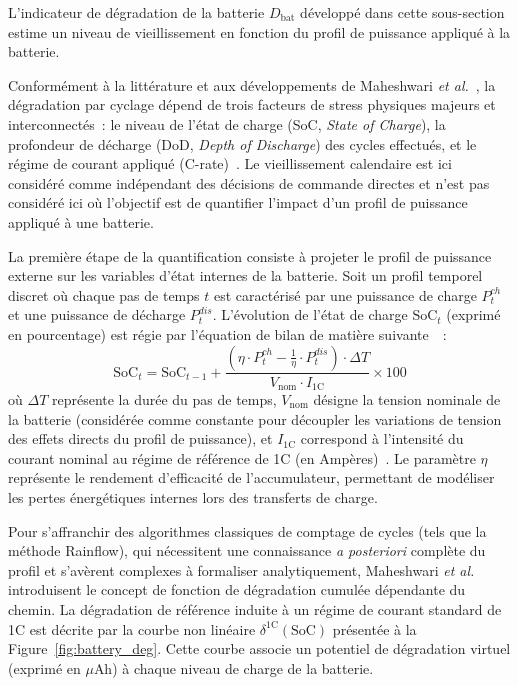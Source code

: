 L'indicateur de dégradation de la batterie $D_{\text{bat}}$ développé dans cette sous-section estime un niveau de vieillissement en fonction du profil de puissance appliqué à la batterie.  

Conformément à la littérature et aux développements de Maheshwari \textit{et al.}~\cite{maheshwari_optimizing_2020}, la dégradation par cyclage dépend de trois facteurs de stress physiques majeurs et interconnectés~: le niveau de l'état de charge (SoC, \textit{State of Charge}), la profondeur de décharge (DoD, \textit{Depth of Discharge}) des cycles effectués, et le régime de courant appliqué (C-rate)~\cite{madani_comprehensive_2025}\cite{asiri_impact_2025}. Le vieillissement calendaire est ici considéré comme indépendant des décisions de commande directes et n'est pas considéré ici où l'objectif est de quantifier l'impact d'un profil de puissance appliqué à une batterie. 

La première étape de la quantification consiste à projeter le profil de puissance externe sur les variables d'état internes de la batterie. Soit un profil temporel discret où chaque pas de temps $t$ est caractérisé par une puissance de charge $P_t^{ch}$ et une puissance de décharge $P_t^{dis}$. L'évolution de l'état de charge $\text{SoC}_t$ (exprimé en pourcentage) est régie par l'équation de bilan de matière suivante~\cite{maheshwari_optimizing_2020}~:
\begin{equation}
    \text{SoC}_t = \text{SoC}_{t-1} + \frac{(\eta \cdot P_t^{ch} - \frac{1}{\eta} \cdot P_t^{dis}) \cdot \Delta T}{V_{\text{nom}} \cdot I_{1\text{C}}} \times 100
    \label{eq:soc_evolution}
\end{equation}
où $\Delta T$ représente la durée du pas de temps, $V_{\text{nom}}$ désigne la tension nominale de la batterie (considérée comme constante pour découpler les variations de tension des effets directs du profil de puissance), et $I_{1\text{C}}$ correspond à l'intensité du courant nominal au régime de référence de 1C (en Ampères)~\cite{maheshwari_optimizing_2020}. Le paramètre $\eta$ représente le rendement d'efficacité de l'accumulateur, permettant de modéliser les pertes énergétiques internes lors des transferts de charge.

Pour s'affranchir des algorithmes classiques de comptage de cycles (tels que la méthode Rainflow), qui nécessitent une connaissance \textit{a posteriori} complète du profil et s'avèrent complexes à formaliser analytiquement, Maheshwari \textit{et al.}~\cite{maheshwari_optimizing_2020} introduisent le concept de fonction de dégradation cumulée dépendante du chemin. La dégradation de référence induite à un régime de courant standard de 1C est décrite par la courbe non linéaire $\delta^{1\text{C}}(\text{SoC})$ présentée à la Figure~\ref{fig:battery_deg}. Cette courbe associe un potentiel de dégradation virtuel (exprimé en $\mu\text{Ah}$) à chaque niveau de charge de la batterie. 

